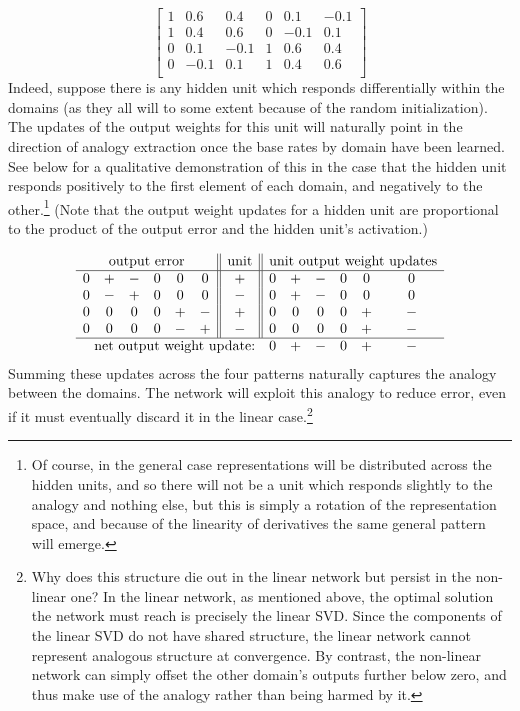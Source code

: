 \documentclass[10pt,letterpaper]{article}
\begin{document}
{ 
\[
\left[ \begin{matrix} 
1 & 0.6 & 0.4 & 0 & 0.1 & -0.1 \\
1 & 0.4 & 0.6 & 0 & -0.1 & 0.1 \\
0 & 0.1 & -0.1 & 1 & 0.6 & 0.4  \\
0 & -0.1 & 0.1 & 1 & 0.4 & 0.6  \\
\end{matrix}  \right] 
\] 
}
Indeed, suppose there is any hidden unit which responds differentially within the domains (as they all will to some extent because of the random initialization). The updates of the output weights for this unit will naturally point in the direction of analogy extraction once the base rates by domain have been learned. See below for a qualitative demonstration of this in the case that the hidden unit responds positively to the first element of each domain, and negatively to the other.\footnote{Of course, in the general case representations will be distributed across the hidden units, and so there will not be a unit which responds slightly to the analogy and nothing else, but this is simply a rotation of the representation space, and because of the linearity of derivatives the same general pattern will emerge.} (Note that the output weight updates for a hidden unit are proportional to the product of the output error and the hidden unit's activation.) \par
{ 
\[
\begin{array}{cccccc||c||cccccc} 
\multicolumn{6}{c||}{\text{output error}}  & \text{unit}  & \multicolumn{6}{c}{\text{unit output weight updates}} \\
\hline
 0 & + & - & 0 & 0 & 0  &   +    &  0 & + & - & 0 & 0 & 0   \\
0 & - & + & 0 & 0 & 0  &   -  & 0 & + & - & 0 & 0 & 0   \\
 0 & 0 & 0 & 0 & + & - &   +   &  0 & 0 & 0 & 0 & + & - \\
 0 & 0 & 0 & 0 & - & +  &  - &  0 & 0 & 0 & 0 & + & - \\
\hline
\multicolumn{7}{r}{\text{net output weight update:}} &   0 & + & - & 0 & + & - \\
\end{array} 
\]
}
Summing these updates across the four patterns naturally captures the analogy between the domains. The network will exploit this analogy to reduce error, even if it must eventually discard it in the linear case.\footnote{ Why does this structure die out in the linear network but persist in the non-linear one? In the linear network, as mentioned above, the optimal solution the network must reach is precisely the linear SVD. Since the components of the linear SVD do not have shared structure, the linear network cannot represent analogous structure at convergence. By contrast, the non-linear network can simply offset the other domain's outputs further below zero, and thus make use of the analogy rather than being harmed by it.} \par 
\end{document}
